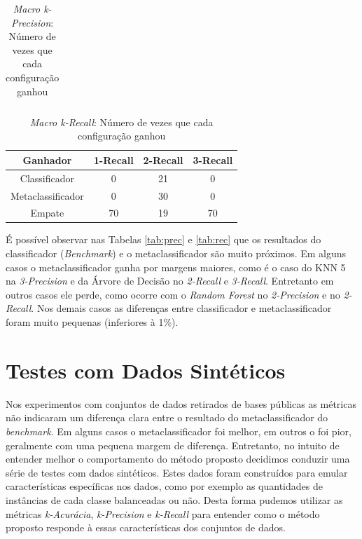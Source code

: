 {\begin{table}[h!]
\begin{center}
\begin{tabular}{cccc}
      \hline
    \end{tabular}
    \caption{\textit{Macro k-Precision}: Número de vezes que cada configuração ganhou}
    \label{tab:count_prec}
  \end{center}
\end{table}

\begin{table}[h!]
  \begin{center}
    \begin{tabular}{cccc}
      \hline
      \textbf{Ganhador} & \textbf{1-Recall} & \textbf{2-Recall} & \textbf{3-Recall}\\
      \hline

Classificador	&	0	&	21	&	0	\\
Metaclassificador	&	0	&	30	&	0	\\
Empate	&	70	&	19	&	70	\\

      \hline
    \end{tabular}
    \caption{\textit{Macro k-Recall}: Número de vezes que cada configuração ganhou}
    \label{tab:count_rec}
  \end{center}
\end{table}

É possível observar nas Tabelas \ref{tab:prec} e \ref{tab:rec} que os resultados do classificador (\textit{Benchmark}) e o metaclassificador são muito próximos.
Em alguns casos o metaclassificador ganha por margens maiores, como é o caso do KNN 5 na \textit{3-Precision} e da Árvore de Decisão no \textit{2-Recall} e \textit{3-Recall}.
Entretanto em outros casos ele perde, como ocorre com o \textit{Random Forest} no \textit{2-Precision} e no \textit{2-Recall}.
Nos demais casos as diferenças entre classificador e metaclassificador foram muito pequenas (inferiores à 1\%).

\section{Testes com Dados Sintéticos}

Nos experimentos com conjuntos de dados retirados de bases públicas as métricas não indicaram um diferença clara entre o resultado do metaclassificador do \textit{benchmark}.
Em alguns casos o metaclassificador foi melhor, em outros o foi pior, geralmente com uma pequena margem de diferença.
Entretanto, no intuito de entender melhor o comportamento do método proposto decidimos conduzir uma série de testes com dados sintéticos.
Estes dados foram construídos para emular características específicas nos dados, como por exemplo as quantidades de instâncias de cada classe balanceadas ou não.
Desta forma pudemos utilizar as métricas \textit{k-Acurácia}, \textit{k-Precision} e \textit{k-Recall} para entender como o método proposto responde à essas características dos conjuntos de dados.

}
